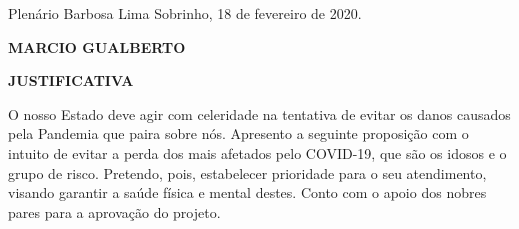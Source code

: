 \documentclass[10pt]{article}
\begin{document}
\begin{center}
  Plenário Barbosa Lima Sobrinho, 18 de fevereiro de 2020.

   \bigskip

  \textbf{ MARCIO GUALBERTO}

  \bigskip

  \textbf{JUSTIFICATIVA}
  \bigskip

\end{center}

  O nosso Estado deve agir com celeridade na tentativa de evitar os danos causados pela Pandemia que paira sobre nós. Apresento a seguinte proposição com o intuito de evitar a perda dos mais afetados pelo COVID-19, que são os idosos e o grupo de risco. Pretendo, pois, estabelecer prioridade para o seu atendimento, visando garantir a saúde física e mental destes. Conto com o apoio dos nobres pares para a aprovação do projeto.



\iffalse
\begin{center}
  \textbf{REFERÊNCIAS}
\end{center}


\fi
\end{document}
